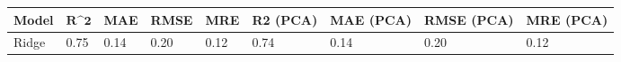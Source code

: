 \begin{table}
\centering
\label{table:iri_reg_pred}
\begin{tabular}{lllllllll}
\toprule
\textbf{Model} & $\textbf{R^2}$ & \textbf{MAE} & \textbf{RMSE} & \textbf{MRE} & \textbf{R2 (PCA)} & \textbf{MAE (PCA)} & \textbf{RMSE (PCA)} & \textbf{MRE (PCA)} \\
\midrule
         Ridge &           0.75 &         0.14 &          0.20 &         0.12 &              0.74 &               0.14 &                0.20 &               0.12 \\
\bottomrule
\end{tabular}
\end{table}
